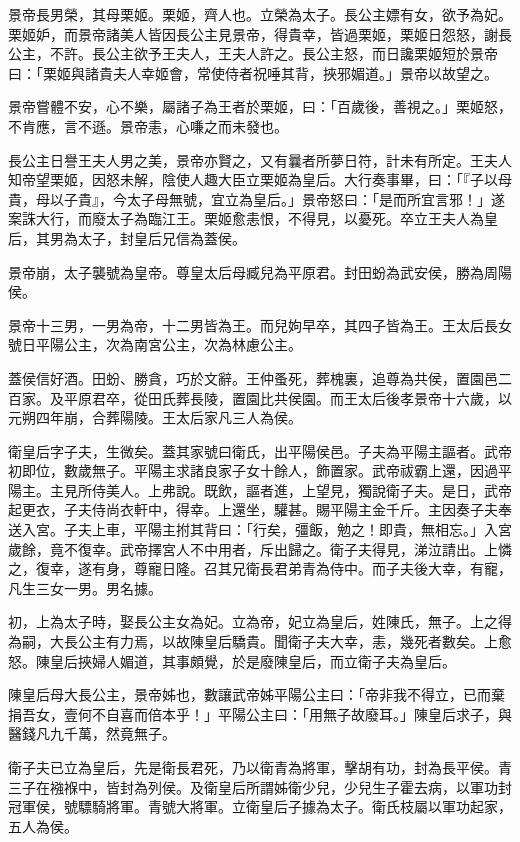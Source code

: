 \begin{pinyinscope}
景帝長男榮，其母栗姬。栗姬，齊人也。立榮為太子。長公主嫖有女，欲予為妃。栗姬妒，而景帝諸美人皆因長公主見景帝，得貴幸，皆過栗姬，栗姬日怨怒，謝長公主，不許。長公主欲予王夫人，王夫人許之。長公主怒，而日讒栗姬短於景帝曰：「栗姬與諸貴夫人幸姬會，常使侍者祝唾其背，挾邪媚道。」景帝以故望之。

景帝嘗體不安，心不樂，屬諸子為王者於栗姬，曰：「百歲後，善視之。」栗姬怒，不肯應，言不遜。景帝恚，心嗛之而未發也。

長公主日譽王夫人男之美，景帝亦賢之，又有曩者所夢日符，計未有所定。王夫人知帝望栗姬，因怒未解，陰使人趣大臣立栗姬為皇后。大行奏事畢，曰：「『子以母貴，母以子貴』，今太子母無號，宜立為皇后。」景帝怒曰：「是而所宜言邪！」遂案誅大行，而廢太子為臨江王。栗姬愈恚恨，不得見，以憂死。卒立王夫人為皇后，其男為太子，封皇后兄信為蓋侯。

景帝崩，太子襲號為皇帝。尊皇太后母臧兒為平原君。封田蚡為武安侯，勝為周陽侯。

景帝十三男，一男為帝，十二男皆為王。而兒姁早卒，其四子皆為王。王太后長女號日平陽公主，次為南宮公主，次為林慮公主。

蓋侯信好酒。田蚡、勝貪，巧於文辭。王仲蚤死，葬槐裏，追尊為共侯，置園邑二百家。及平原君卒，從田氏葬長陵，置園比共侯園。而王太后後孝景帝十六歲，以元朔四年崩，合葬陽陵。王太后家凡三人為侯。

衛皇后字子夫，生微矣。蓋其家號曰衛氏，出平陽侯邑。子夫為平陽主謳者。武帝初即位，數歲無子。平陽主求諸良家子女十餘人，飾置家。武帝祓霸上還，因過平陽主。主見所侍美人。上弗說。既飲，謳者進，上望見，獨說衛子夫。是日，武帝起更衣，子夫侍尚衣軒中，得幸。上還坐，驩甚。賜平陽主金千斤。主因奏子夫奉送入宮。子夫上車，平陽主拊其背曰：「行矣，彊飯，勉之！即貴，無相忘。」入宮歲餘，竟不復幸。武帝擇宮人不中用者，斥出歸之。衛子夫得見，涕泣請出。上憐之，復幸，遂有身，尊寵日隆。召其兄衛長君弟青為侍中。而子夫後大幸，有寵，凡生三女一男。男名據。

初，上為太子時，娶長公主女為妃。立為帝，妃立為皇后，姓陳氏，無子。上之得為嗣，大長公主有力焉，以故陳皇后驕貴。聞衛子夫大幸，恚，幾死者數矣。上愈怒。陳皇后挾婦人媚道，其事頗覺，於是廢陳皇后，而立衛子夫為皇后。

陳皇后母大長公主，景帝姊也，數讓武帝姊平陽公主曰：「帝非我不得立，已而棄捐吾女，壹何不自喜而倍本乎！」平陽公主曰：「用無子故廢耳。」陳皇后求子，與醫錢凡九千萬，然竟無子。

衛子夫已立為皇后，先是衛長君死，乃以衛青為將軍，擊胡有功，封為長平侯。青三子在襁褓中，皆封為列侯。及衛皇后所謂姊衛少兒，少兒生子霍去病，以軍功封冠軍侯，號驃騎將軍。青號大將軍。立衛皇后子據為太子。衛氏枝屬以軍功起家，五人為侯。


\end{pinyinscope}
